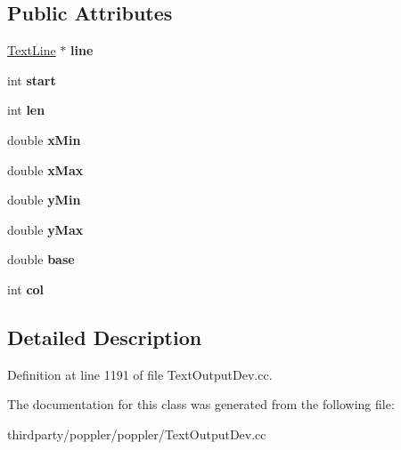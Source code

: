 \subsection*{Public Attributes}
\begin{DoxyCompactItemize}
\item 
\mbox{\label{class_text_line_frag_acb654cb89cbe3c042efb1f7a44cf34fc}} 
\hyperlink{class_text_line}{Text\+Line} $\ast$ {\bfseries line}
\item 
\mbox{\label{class_text_line_frag_acb11699400dd7ebb11adc260bc79688b}} 
int {\bfseries start}
\item 
\mbox{\label{class_text_line_frag_a1facf2baf5ced444648cdbd33ed9bf8f}} 
int {\bfseries len}
\item 
\mbox{\label{class_text_line_frag_a1de0d7a3ed3af2797cdf7dc844a15d20}} 
double {\bfseries x\+Min}
\item 
\mbox{\label{class_text_line_frag_ac16b36e59b3e550fcd7b4d89274d38bd}} 
double {\bfseries x\+Max}
\item 
\mbox{\label{class_text_line_frag_aefa83916043545281631b7b891b7afdd}} 
double {\bfseries y\+Min}
\item 
\mbox{\label{class_text_line_frag_a73eab863c48d75892bd7a9ff4efd3c69}} 
double {\bfseries y\+Max}
\item 
\mbox{\label{class_text_line_frag_ae47893c2785f402cb2c23beef84be953}} 
double {\bfseries base}
\item 
\mbox{\label{class_text_line_frag_a1966ed511ab9b39d1a19ae4c1caf9d7e}} 
int {\bfseries col}
\end{DoxyCompactItemize}


\subsection{Detailed Description}


Definition at line 1191 of file Text\+Output\+Dev.\+cc.



The documentation for this class was generated from the following file\+:\begin{DoxyCompactItemize}
\item 
thirdparty/poppler/poppler/Text\+Output\+Dev.\+cc\end{DoxyCompactItemize}
